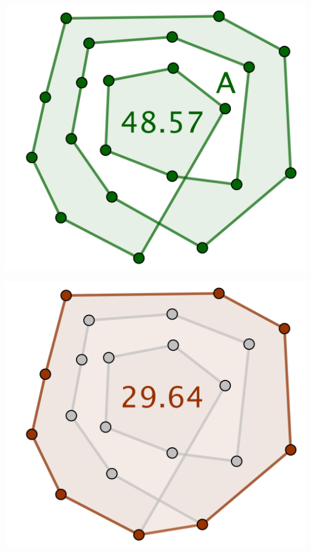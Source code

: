 \begin{multicols}{2}
	\small\itshape\centering
	\includegraphics[scale=.4]{content/polygon/geo-area/geo-area-ncycle-not-opti-pb-1.png}

	\includegraphics[scale=.4]{content/polygon/geo-area/geo-area-ncycle-not-opti-pb-2.png}
\end{multicols}


